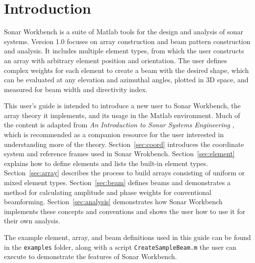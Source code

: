 \section{Introduction}\label{sec:intro}

Sonar Workbench is a suite of Matlab tools for the design and analysis of sonar systems. Version 1.0 focuses on array construction and beam pattern construction and analysis. It includes multiple element types, from which the user constructs an array with arbitrary element position and orientation. The user defines complex weights for each element to create a beam with the desired shape, which can be evaluated at any elevation and azimuthal angles, plotted in 3D space, and measured for beam width and directivity index.

This user's guide is intended to introduce a new user to Sonar Workbench, the array theory it implements, and its usage in the Matlab environment. Much of the content is adapted from \emph{An Introduction to Sonar Systems Engineering} \cite{Ziomek}, which is recommended as a companion resource for the user interested in understanding more of the theory. Section~\ref{sec:coord} introduces the coordinate system and reference frames used in Sonar Wrokbench. Section~\ref{sec:element} explains how to define elements and lists the built-in element types. Section~\ref{sec:array} describes the process to build arrays consisting of uniform or mixed element types. Section~\ref{sec:beam} defines beams and demonstrates a method for calculating amplitude and phase weights for conventional beamforming. Section~\ref{sec:analysis} demonstrates how Sonar Workbench implements these concepts and conventions and shows the user how to use it for their own analysis.

The example element, array, and beam definitions used in this guide can be found in the \texttt{examples} folder, along with a script \texttt{CreateSampleBeam.m} the user can execute to demonstrate the features of Sonar Workbench. 